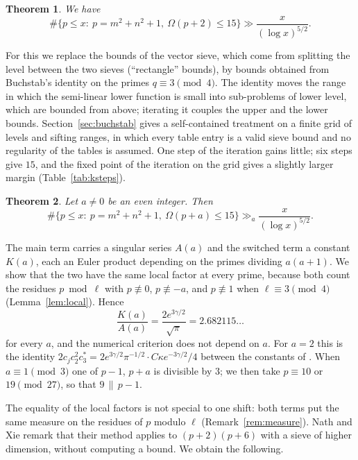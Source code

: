 \documentclass[11pt,a4paper]{amsart}
\newtheorem{theorem}{Theorem}[section]
\theoremstyle{remark}
\numberwithin{equation}{section}
\begin{document}
\begin{theorem}\label{thm:15}
We have
\[
\#\{p\le x:\ p=m^2+n^2+1,\ \Omega(p+2)\le 15\}\gg\frac{x}{(\log x)^{5/2}} .
\]
\end{theorem}

For this we replace the bounds of the vector sieve, which come from splitting the level between the two sieves
(``rectangle'' bounds), by bounds obtained from Buchstab's identity on the primes $q\equiv3\pmod 4$. The identity
moves the range in which the semi-linear lower function is small into sub-problems of lower level, which are
bounded from above; iterating it couples the upper and the lower bounds. Section~\ref{sec:buchstab} gives a
self-contained treatment on a finite grid of levels and sifting ranges, in which every table entry is a valid
sieve bound and no regularity of the tables is assumed. One step of the iteration gains little; six steps give
$15$, and the fixed point of the iteration on the grid gives a slightly larger margin
(Table~\ref{tab:ksteps}).

\begin{theorem}\label{thm:shift}
Let $a\ne0$ be an even integer. Then
\[
\#\{p\le x:\ p=m^2+n^2+1,\ \Omega(p+a)\le 15\}\gg_a\frac{x}{(\log x)^{5/2}} .
\]
\end{theorem}

The main term carries a singular series $A(a)$ and the switched term a constant $K(a)$, each an Euler product
depending on the primes dividing $a(a+1)$. We show that the two have the same local factor at every prime,
because both count the residues $p\bmod\ell$ with $p\not\equiv0$, $p\not\equiv-a$, and $p\not\equiv1$ when
$\ell\equiv3\pmod 4$ (Lemma~\ref{lem:local}). Hence
\begin{equation}\label{eq:KA}
\frac{K(a)}{A(a)}=\frac{2e^{3\gamma/2}}{\sqrt\pi}=2.682115\ldots
\end{equation}
for every $a$, and the numerical criterion does not depend on $a$. For $a=2$ this is the identity
$2c_jc_2^2c_3^*=2e^{3\gamma/2}\pi^{-1/2}\cdot C\kappa e^{-3\gamma/2}/4$ between the constants of \cite{NX,NXerr}. When
$a\equiv1\pmod 3$ one of $p-1$, $p+a$ is divisible by $3$; we then take $p\equiv10$ or $19\pmod{27}$, so that
$9\,\|\,p-1$.

The equality of the local factors is not special to one shift: both terms put the same measure on the
residues of $p$ modulo $\ell$ (Remark~\ref{rem:measure}). Nath and Xie remark \cite[Remark~1.3]{NX} that their
method applies to $(p+2)(p+6)$ with a sieve of higher dimension, without computing a bound. We obtain the
following.
\end{document}
